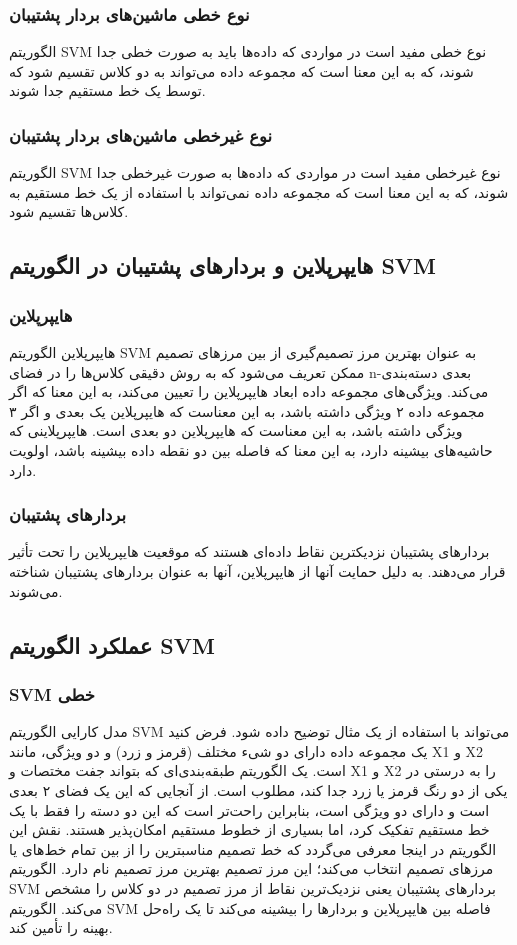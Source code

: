 \documentclass{CSICC2020}
\begin{document}
\subsubsection{نوع خطی ماشین‌های بردار پشتیبان}
الگوریتم SVM نوع خطی مفید است در مواردی که داده‌ها باید به صورت خطی جدا شوند، که به این معنا است که مجموعه داده می‌تواند به دو کلاس تقسیم شود که توسط یک خط مستقیم جدا شوند. 
\subsubsection{نوع غیرخطی ماشین‌های بردار پشتیبان }
الگوریتم SVM نوع غیرخطی مفید است در مواردی که داده‌ها به صورت غیرخطی جدا شوند، که به این معنا است که مجموعه داده نمی‌تواند با استفاده از یک خط مستقیم به کلاس‌ها تقسیم شود. 

\subsection{هایپرپلاین و بردارهای پشتیبان در الگوریتم SVM}

\subsubsection{هایپرپلاین}
هایپرپلاین الگوریتم SVM به عنوان بهترین مرز تصمیم‌گیری از بین مرزهای تصمیم ممکن تعریف می‌شود که به روش دقیقی کلاس‌ها را در فضای n-بعدی دسته‌بندی می‌کند. ویژگی‌های مجموعه داده ابعاد هایپرپلاین را تعیین می‌کند، به این معنا که اگر مجموعه داده ۲ ویژگی داشته باشد، به این معناست که هایپرپلاین یک بعدی و اگر ۳ ویژگی داشته باشد، به این معناست که هایپرپلاین دو بعدی است. هایپرپلاینی که حاشیه‌های بیشینه دارد، به این معنا که فاصله بین دو نقطه داده بیشینه باشد، اولویت دارد. 
\subsubsection{بردارهای پشتیبان}
بردارهای پشتیبان نزدیکترین نقاط داده‌ای هستند که موقعیت هایپرپلاین را تحت تأثیر قرار می‌دهند. به دلیل حمایت آنها از هایپرپلاین، آنها به عنوان بردارهای پشتیبان شناخته می‌شوند. 

\subsection{عملکرد الگوریتم SVM}

\subsubsection{SVM خطی}
مدل کارایی الگوریتم SVM می‌تواند با استفاده از یک مثال توضیح داده شود. فرض کنید یک مجموعه داده دارای دو شیء مختلف (قرمز و زرد) و دو ویژگی، مانند X1 و X2 است. یک الگوریتم طبقه‌بندی‌ای که بتواند جفت مختصات و  X1 و X2 را به درستی در یکی از دو رنگ قرمز یا زرد جدا کند، مطلوب است. از آنجایی که این یک فضای ۲ بعدی است و دارای دو ویژگی است، بنابراین راحت‌تر است که این دو دسته را فقط با یک خط مستقیم تفکیک کرد، اما بسیاری از خطوط مستقیم امکان‌پذیر هستند. نقش این الگوریتم در اینجا معرفی می‌گردد که خط تصمیم مناسبترین را از بین تمام خط‌های یا مرزهای تصمیم انتخاب می‌کند؛ این مرز تصمیم بهترین مرز تصمیم نام دارد. الگوریتم SVM بردارهای پشتیبان یعنی نزدیک‌ترین نقاط از مرز تصمیم در دو کلاس را مشخص می‌کند. الگوریتم SVM فاصله بین هایپرپلاین و بردارها را بیشینه می‌کند تا یک راه‌حل بهینه را تأمین کند. 
\end{document}
